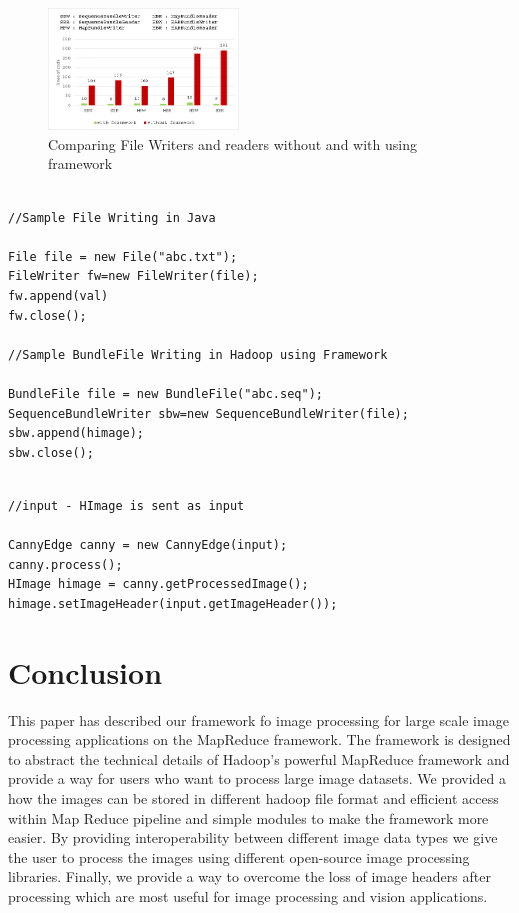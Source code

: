 \documentclass[conference]{IEEEtran}
\begin{document}
\begin{figure}[h]
	\centering
	\includegraphics[width=0.45\textwidth]{files-chart2}
	\caption{Comparing File Writers and readers without and with using framework }
	\label{fig:files-chart}
\end{figure}



\begin{lstlisting}[caption = Comparing File Writer instance in java and SequenceBundleWriter instance in Hadoop Image Processing framework ]

//Sample File Writing in Java

File file = new File("abc.txt");
FileWriter fw=new FileWriter(file);
fw.append(val)
fw.close();

//Sample BundleFile Writing in Hadoop using Framework

BundleFile file = new BundleFile("abc.seq");
SequenceBundleWriter sbw=new SequenceBundleWriter(file);
sbw.append(himage);
sbw.close();

\end{lstlisting}


\begin{lstlisting}[caption = Setting image headers for processed images using Hadoop Image Processing Framework]

//input - HImage is sent as input 

CannyEdge canny = new CannyEdge(input);
canny.process();
HImage himage = canny.getProcessedImage();
himage.setImageHeader(input.getImageHeader());

\end{lstlisting}
\section{Conclusion}
This paper has described our framework fo image processing for large scale image processing applications on the MapReduce framework. The framework is designed to abstract the technical details of Hadoop's powerful MapReduce framework and provide a way for users who want to process large image datasets. We provided a how the images can be stored in different hadoop file format and efficient access within Map Reduce pipeline and simple modules to make the framework more easier. By providing interoperability between different image data types we give the user to process the images using different open-source image processing libraries. Finally, we provide a way to overcome the loss of image headers after processing which are most useful for image processing and vision applications.
\end{document}
